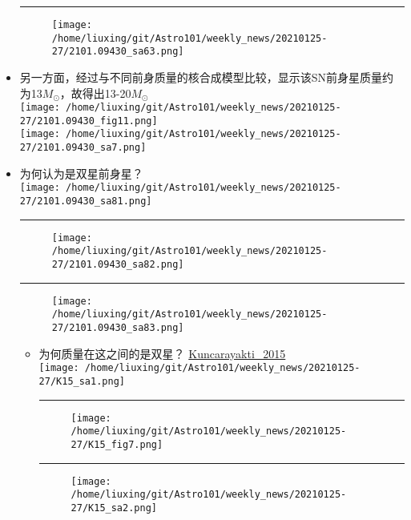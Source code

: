 \documentclass[
]{article}
\begin{document}
\begin{itemize}
  \begin{center}\rule{0.5\linewidth}{0.5pt}\end{center}

  \begin{figure}
  \centering
  \texttt{[image: /home/liuxing/git/Astro101/weekly\_news/20210125-27/2101.09430\_sa63.png]}
  \caption{}
  \end{figure}
\item
  另一方面，经过与不同前身质量的核合成模型比较，显示该SN前身星质量约为13\(M_⊙\)，故得出13-20\(M_⊙\)\\
  \texttt{[image: /home/liuxing/git/Astro101/weekly\_news/20210125-27/2101.09430\_fig11.png]}\\
  \texttt{[image: /home/liuxing/git/Astro101/weekly\_news/20210125-27/2101.09430\_sa7.png]}
\item
  为何认为是双星前身星？\\
  \texttt{[image: /home/liuxing/git/Astro101/weekly\_news/20210125-27/2101.09430\_sa81.png]}

  \begin{center}\rule{0.5\linewidth}{0.5pt}\end{center}

  \begin{figure}
  \centering
  \texttt{[image: /home/liuxing/git/Astro101/weekly\_news/20210125-27/2101.09430\_sa82.png]}
  \caption{}
  \end{figure}

  \begin{center}\rule{0.5\linewidth}{0.5pt}\end{center}

  \begin{figure}
  \centering
  \texttt{[image: /home/liuxing/git/Astro101/weekly\_news/20210125-27/2101.09430\_sa83.png]}
  \caption{}
  \end{figure}

  \begin{itemize}
  \item
    为何质量在这之间的是双星？
    \href{Kuncarayakti_2015.pdf}{Kuncarayakti\_2015}\\
    \texttt{[image: /home/liuxing/git/Astro101/weekly\_news/20210125-27/K15\_sa1.png]}

    \begin{center}\rule{0.5\linewidth}{0.5pt}\end{center}

    \begin{figure}
    \centering
    \texttt{[image: /home/liuxing/git/Astro101/weekly\_news/20210125-27/K15\_fig7.png]}
    \caption{}
    \end{figure}

    \begin{center}\rule{0.5\linewidth}{0.5pt}\end{center}

    \begin{figure}
    \centering
    \texttt{[image: /home/liuxing/git/Astro101/weekly\_news/20210125-27/K15\_sa2.png]}
    \caption{}
    \end{figure}
  \end{itemize}
\end{itemize}
\end{document}
